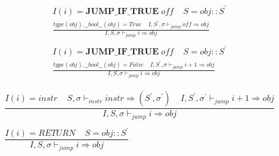 \documentclass[12pt, a4paper]{report}
\newcommand{\ddfrac}[3]{
    & #1 \\
    & \frac { #2 } { #3 }
}
\newcommand{\gap}{ \;\;\;\; }
\begin{document}
\begin{equation*}
\begin{split}
\ddfrac{
    I(i) = \mathbf{JUMP\_IF\_TRUE} \; \mathit{off}
    \gap
    S = obj :: S^{'}
}{
     type(obj).\_\_bool\_\_(obj) = True
     \gap
    I, S^{'}, \sigma \vdash_{jump} \mathit{off} \Rightarrow obj
}{ I, S, \sigma \vdash_{jump} i \Rightarrow obj }
\\ \\
\ddfrac{
    I(i) = \mathbf{JUMP\_IF\_TRUE} \; \mathit{off}
    \gap
    S = obj :: S^{'}
}{
    type(obj).\_\_bool\_\_(obj) = False
    \gap
    I, S^{'}, \sigma \vdash_{jump} \mathit{i}+1 \Rightarrow obj
}{ I, S, \sigma \vdash_{jump} i \Rightarrow obj}
\end{split}
\end{equation*}

\begin{equation*}
\begin{split}
& \dfrac{
    I(i) = \mathit{instr}
    \gap
    S, \sigma \vdash_{instr} instr \Rightarrow (S^{'}, \sigma^{'})
    \gap
    I, S^{'}, \sigma^{'} \vdash_{jump} i + 1 \Rightarrow obj
}{
    I, S, \sigma \vdash_{jump} i \Rightarrow obj
}
\\ \\
& \dfrac{
    I(i) = \mathit{RETURN}
    \gap
    S = obj :: S^{'}
}{
    I, S, \sigma \vdash_{jump} i \Rightarrow obj
}    
\end{split}
\end{equation*}

\hrulefill

% 
\end{document}
